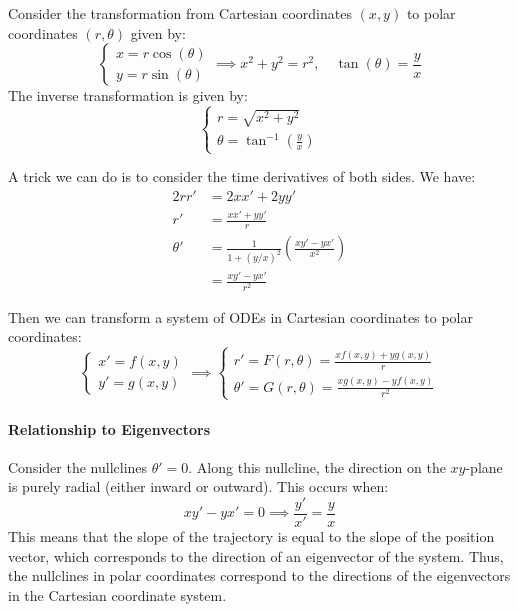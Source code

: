 \documentclass[11pt]{article}
\begin{document}
\begin{definition}
    Consider the transformation from Cartesian coordinates \( (x, y) \) to polar coordinates \( (r, \theta) \) given by:
    \begin{equation}
        \begin{cases}
        x = r \cos(\theta) \\
        y = r \sin(\theta)
        \end{cases} \implies x^2 + y^2 = r^2, \quad \tan(\theta) = \frac{y}{x}
        \end{equation}
    The inverse transformation is given by:
    \begin{equation}
        \begin{cases}
        r = \sqrt{x^2 + y^2} \\
        \theta = \tan^{-1}\left(\frac{y}{x}\right)
        \end{cases}
    \end{equation}

    A trick we can do is to consider the time derivatives of both sides. We have:
    \begin{align*}
     2 r r' &= 2x x' + 2y y'  \\
     r' &= \frac{x x' + y y'}{r} \\
     \theta' &= \frac{1}{1 + (y/x)^2} \left(\frac{x y' - y x'}{x^2}\right) \\
     &= \frac{x y' - y x'}{r^2}
    \end{align*}

    Then we can transform a system of ODEs in Cartesian coordinates to polar coordinates:
    \begin{equation}
        \begin{cases}
        x' = f(x, y) \\
        y' = g(x, y)
        \end{cases} \implies
        \begin{cases}
        r' = F(r, \theta) = \frac{x f(x, y) + y g(x, y)}{r} \\
        \theta' = G(r, \theta) = \frac{x g(x, y) - y f(x, y)}{r^2}
        \end{cases}
    \end{equation}

\end{definition}

\paragraph{Relationship to Eigenvectors} Consider the nullclines $\theta' = 0$. Along this nullcline, the direction on the $xy$-plane is purely radial (either inward or outward). This occurs when:
$$x y' - y x' = 0 \implies \frac{y'}{x'} = \frac{y}{x}$$
This means that the slope of the trajectory is equal to the slope of the position vector, which corresponds to the direction of an eigenvector of the system. Thus, the nullclines in polar coordinates correspond to the directions of the eigenvectors in the Cartesian coordinate system.
\end{document}
